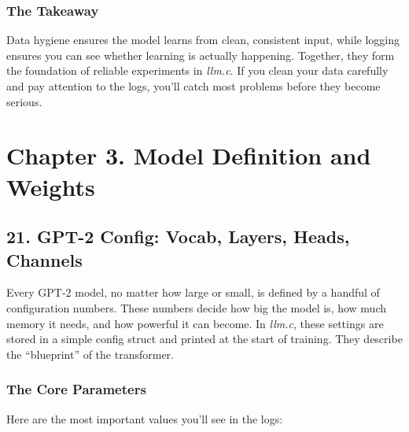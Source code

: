 \documentclass[
  letterpaper,
  DIV=11,
  numbers=noendperiod]{scrreprt}
\begin{document}
\subsubsection{The Takeaway}\label{the-takeaway-9}

Data hygiene ensures the model learns from clean, consistent input,
while logging ensures you can see whether learning is actually
happening. Together, they form the foundation of reliable experiments in
\emph{llm.c}. If you clean your data carefully and pay attention to the
logs, you'll catch most problems before they become serious.

\section{Chapter 3. Model Definition and
Weights}\label{chapter-3.-model-definition-and-weights}

\subsection{21. GPT-2 Config: Vocab, Layers, Heads,
Channels}\label{gpt-2-config-vocab-layers-heads-channels}

Every GPT-2 model, no matter how large or small, is defined by a handful
of configuration numbers. These numbers decide how big the model is, how
much memory it needs, and how powerful it can become. In \emph{llm.c},
these settings are stored in a simple config struct and printed at the
start of training. They describe the ``blueprint'' of the transformer.

\subsubsection{The Core Parameters}\label{the-core-parameters}

Here are the most important values you'll see in the logs:
\end{document}
